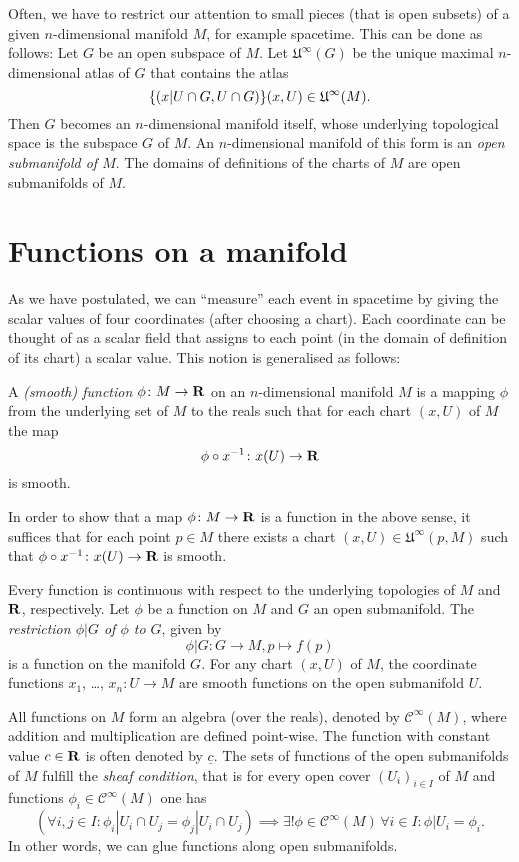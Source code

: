 Often, we have to restrict our attention to small pieces (that is open subsets)
of a given $n$-dimensional manifold $M$, for example spacetime. This can be
done as follows: Let $G$ be an open subspace of $M$. Let $\mathfrak U^\infty(G)$
be the unique maximal $n$-dimensional atlas of $G$ that contains the atlas
\[
  \lbrace(x|U \cap G, U \cap G)\rbrace{(x, U) \in \mathfrak U^\infty(M)}.
\]
Then $G$ becomes an $n$-dimensional manifold itself, whose underlying topological
space is the subspace $G$ of $M$. An $n$-dimensional manifold of this form is
an \emph{open submanifold of $M$}. The domains of definitions of the charts of
$M$ are open submanifolds of $M$.

\section{Functions on a manifold}
\label{sec:functions}

As we have postulated, we can ``measure'' each event in spacetime by giving the
scalar values of four coordinates (after choosing a chart). Each coordinate can
be thought of as a scalar field that assigns to each point (in the domain of
definition of its chart) a scalar value. This notion is generalised as follows:

\begin{dfn}
  A \emph{(smooth) function $\phi\colon M \to \mathbf{R}$} on an $n$-dimensional
  manifold $M$ is a mapping $\phi$ from the underlying set of $M$ to the reals
  such that for each chart $(x, U)$ of $M$ the map
  \[
    \phi \circ x^{-1}\colon x(U) \to \mathbf{R}
  \]
  is smooth.
\end{dfn}

In order to show that a map $\phi\colon M \to \mathbf{R}$ is a function in the above
sense, it suffices that
for each point $p \in M$ there exists a chart $(x, U) \in \mathfrak U^\infty(p, M)$
such that $\phi \circ x^{-1}\colon x(U) \to \mathbf{R}$ is smooth.

Every function is continuous with respect to the underlying
topologies of $M$ and $\mathbf{R}$, respectively. Let $\phi$ be a function on $M$
and $G$ an open submanifold. The \emph{restriction $\phi|G$ of $\phi$ to $G$},
given by
\[
  \phi|G\colon G \to M, p \mapsto f(p)
\]
is a function on the manifold $G$. For any chart $(x, U)$ of $M$, the coordinate
functions $x_1$, \dots, $x_n\colon U \to M$ are smooth functions on the open
submanifold $U$.

All functions on $M$ form an algebra (over the reals), denoted by
$\mathcal C^\infty(M)$, where addition and multiplication are defined point-wise.
The function with constant value $c \in \mathbf{R}$ is often denoted by $\underline c$.
The sets of functions of the open submanifolds of $M$ fulfill the \emph{sheaf
condition}, that is for every open cover $(U_i)_{i \in I}$ of $M$ and functions
$\phi_i \in \mathcal C^\infty(M)$ one has
\[
  \left(\forall i, j \in I : \phi_i|U_i \cap U_j = \phi_j|U_i \cap U_j\right)
  \implies \exists! \phi \in \mathcal C^\infty(M) \, \forall i \in I :
  \phi|U_i = \phi_i.
\]
In other words, we can glue functions along open submanifolds.

